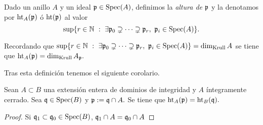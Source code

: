\documentclass[../main.tex]{subfiles}
\begin{document}
\begin{definition}
Dado un anillo $A$ y un ideal $\mathfrak{p}\in\text{Spec}(A)$, definimos la \textit{altura de $\mathfrak{p}$} y la denotamos por $\operatorname{ht}_A(\mathfrak{p})$ ó $\operatorname{ht}(\mathfrak{p})$ al valor
$$\sup\{r\in\mathbb{N}\ :\ \exists\mathfrak{p}_0\supsetneq \cdots \supsetneq \mathfrak{p}_r,\ \mathfrak{p}_i\in\text{Spec}(A)\}.$$
\end{definition}

\begin{remark}
Recordando que $\sup\{r\in\N\ :\ \exists\p_0\supsetneq \cdots \supsetneq \p_r,\ \p_i\in\Spec A\}=\dimk A$ se tiene que $\operatorname{ht}_A(\mathfrak{p})=\dim_{\text{Krull}} A_{\mathfrak{p}}.$
\end{remark}

Tras esta definición tenemos el siguiente corolario.

\begin{corollary}
Sean $A\subset B$ una extensión entera de dominios de integridad y $A$ íntegramente cerrado. Sea $\mathfrak{q}\in\text{Spec}(B)$ y $\mathfrak{p}:=\mathfrak{q}\cap A.$ Se tiene que $\operatorname{ht}_A(\mathfrak{p})=\operatorname{ht}_B(\mathfrak{q}).$
\end{corollary}

\begin{proof}
Si $\mathfrak{q}_1\subset\mathfrak{q}_0\in\text{Spec}(B)$, $\mathfrak{q}_1\cap A=\mathfrak{q}_0\cap A$
\end{proof}
\end{document}

